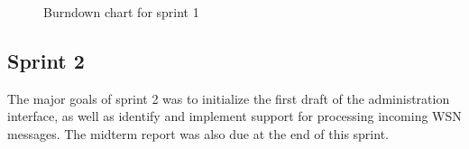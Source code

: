 \begin{center}
  \begin{figure}[htbp!]
    \caption{Burndown chart for sprint 1}
    \label{fig:sprint 1, burndown}
  \end{figure}
\end{center}

\subsection{Sprint 2}
\label{subsec:project_lifecycle-development-sprint_2}

The major goals of sprint 2 was to initialize the first draft of the administration interface, as well as identify and implement support for processing incoming WSN messages. The midterm report was also due at the end of this sprint.

